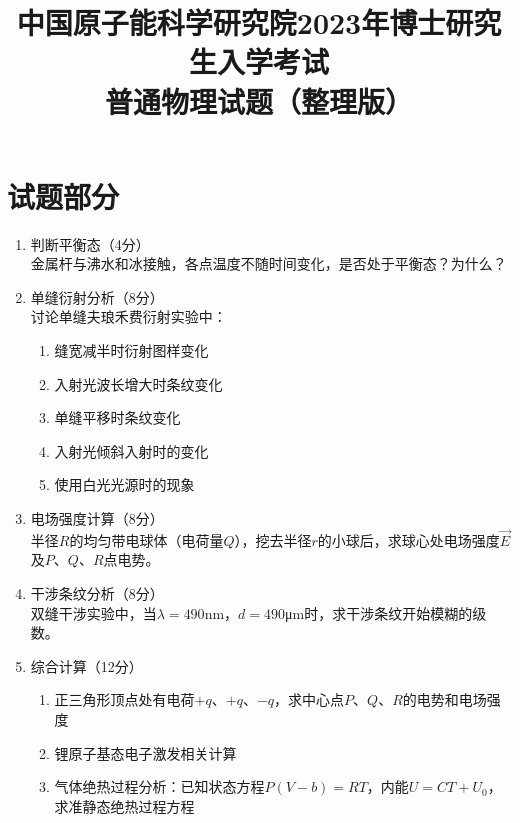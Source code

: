 \documentclass[12pt]{article}
\begin{document}
\title{中国原子能科学研究院2023年博士研究生入学考试\\普通物理试题（整理版）}
\author{}
\date{}
\maketitle

\section*{试题部分}
\begin{enumerate}[label=\arabic*.]
    \item 判断平衡态（4分）\\
    金属杆与沸水和冰接触，各点温度不随时间变化，是否处于平衡态？为什么？
    
    \item 单缝衍射分析（8分）\\
    讨论单缝夫琅禾费衍射实验中：
    \begin{enumerate}
        \item 缝宽减半时衍射图样变化
        \item 入射光波长增大时条纹变化
        \item 单缝平移时条纹变化
        \item 入射光倾斜入射时的变化
        \item 使用白光光源时的现象
    \end{enumerate}

    
    \item 电场强度计算（8分）\\
    半径$R$的均匀带电球体（电荷量$Q$），挖去半径$r$的小球后，求球心处电场强度$\vec{E}$及$P$、$Q$、$R$点电势。
    
    \item 干涉条纹分析（8分）\\
    双缝干涉实验中，当$\lambda=490$nm，$d=490$μm时，求干涉条纹开始模糊的级数。
    
    \item 综合计算（12分）
    \begin{enumerate}
        \item 正三角形顶点处有电荷$+q$、$+q$、$-q$，求中心点$P$、$Q$、$R$的电势和电场强度
        \item 锂原子基态电子激发相关计算
        \item 气体绝热过程分析：已知状态方程$P(V-b)=RT$，内能$U=CT+U_0$，求准静态绝热过程方程
    \end{enumerate}
\end{enumerate}
\end{document}
